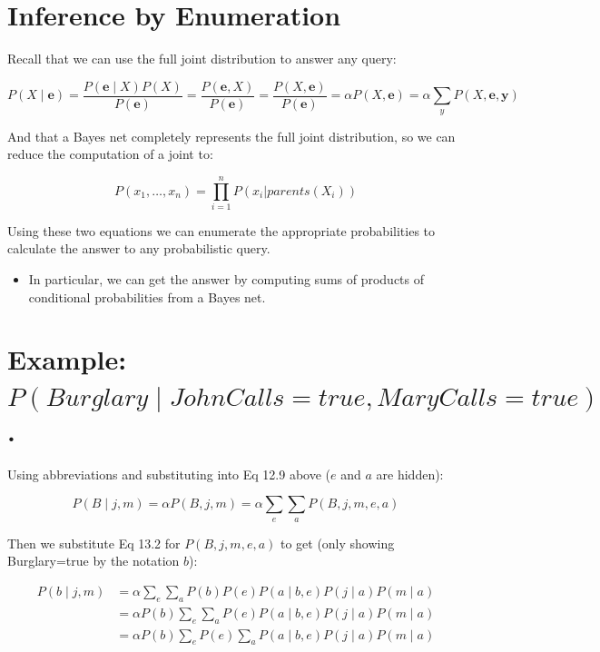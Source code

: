 \documentclass[smaller]{article}
\begin{document}
\section{Inference by Enumeration}
\label{sec:orgfafed0a}

Recall that we can use the full joint distribution to answer any query:

\begin{equation}
P(X \mid \bm{e})
= \frac{P(\bm{e} \mid X) P(X)}{P(\bm{e})}
= \frac{P(\bm{e}, X)}{P(\bm{e})}
= \frac{P(X, \bm{e})}{P(\bm{e})}
= \alpha P(X, \bm{e})
= \alpha \sum_y P(X, \bm{e}, \bm{y}) \tag{12.9}
\end{equation}


And that a Bayes net completely represents the full joint distribution, so we can reduce the computation of a joint to:

\begin{equation}
P(x_1, \dots, x_n) = \prod_{i=1}^n P( x_i | parents(X_i)) \tag{13.2}
\end{equation}

Using these two equations we can enumerate the appropriate probabilities to calculate the answer to any probabilistic query.

\begin{itemize}
\item In particular, we can get the answer by computing sums of products of conditional probabilities from a Bayes net.
\end{itemize}
\section{Example: \(P(Burglary \mid JohnCalls=true, MaryCalls=true)\).}
\label{sec:org90e5651}

Using abbreviations and substituting into Eq 12.9 above (\(e\) and \(a\) are hidden):


\begin{equation}
P(B \mid j, m) = \alpha P(B, j, m) = \alpha \sum_e \sum_a P(B, j, m, e, a)
\end{equation}


Then we substitute Eq 13.2 for \(P(B, j, m, e, a)\) to get (only showing Burglary=true by the notation \(b\)):


\vspace{-.1in}
\begin{align*}
P(b \mid j, m) &= \alpha \sum_e \sum_a P(b) P(e) P(a \mid b, e) P(j \mid a) P(m \mid a) \tag{1}\\
                &= \alpha P(b) \sum_e \sum_a P(e) P(a \mid b, e) P(j \mid a) P(m \mid a) \tag{2}\\
                &= \alpha P(b) \sum_e P(e) \sum_a P(a \mid b, e) P(j \mid a) P(m \mid a) \tag{3}
\end{align*}
\vspace{-.1in}
\end{document}
